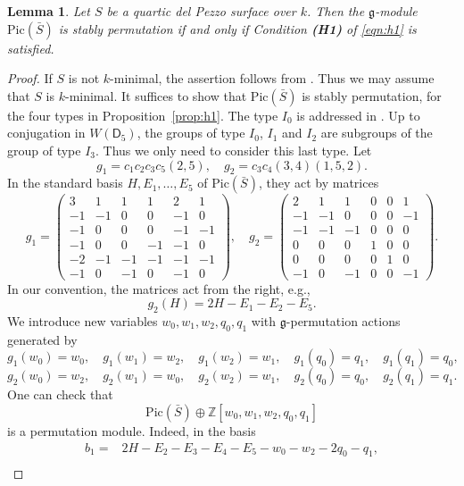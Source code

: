 \documentclass[10pt,a4paper]{amsart}
\newtheorem{lemm}{Lemma}
\def\Pic{\mathrm{Pic}}
\def\bZ{{\mathbb Z}}
\def\sD{{\mathsf D}}
\begin{document}
\begin{lemm}\label{lemm:stablyperm}
    Let $S$ be a quartic del Pezzo surface over $k$. Then 
    the $\mathfrak g$-module 
    $\Pic(\bar{S})$ is stably permutation if and only if Condition {\bf (H1)} of  \eqref{eqn:h1} is satisfied.
\end{lemm}
   \begin{proof}
      If $S$ is not $k$-minimal, the assertion follows from 
      \cite{manin-book}. Thus we may assume that $S$ is $k$-minimal. It suffices to show that $\Pic(\bar{S})$ is stably permutation, for the four types in Proposition~\ref{prop:h1}. The type $I_0$ is addressed in \cite{bctspstably}. Up to conjugation in $W(\sD_5)$, the groups of type $I_0$, $I_1$ and $I_2$ are subgroups of the group of type $I_3$. Thus we only need to consider this last type. 
      Let 
      $$
      g_1=c_1c_2c_3c_5(2,5), \quad g_2=c_3c_4(3,4)(1,5,2).
      $$
      In the standard basis $H, E_1,\ldots,E_5$ of  $\Pic(\bar{S})$, they act by matrices
{\small
$$
g_1=
\begin{pmatrix}
 3& 1& 1& 1& 2& 1\\
-1&-1& 0& 0&-1& 0\\
-1& 0& 0& 0&-1&-1\\
-1& 0& 0&-1&-1& 0\\
-2&-1&-1&-1&-1&-1\\
-1& 0&-1& 0&-1& 0
\end{pmatrix},
\quad
g_2=
\begin{pmatrix}
 2& 1& 1& 0& 0& 1\\
-1&-1& 0& 0& 0&-1\\
-1&-1&-1& 0& 0& 0\\
 0& 0& 0& 1& 0& 0\\
 0& 0& 0& 0& 1& 0\\
-1& 0&-1& 0& 0&-1
\end{pmatrix}.
$$}
In our convention, the matrices act from the right, e.g.,  
$$
g_2(H)=2H-E_1-E_2-E_5.
$$
We introduce new variables $w_0,w_1,w_2,q_0,q_1$ with $\mathfrak g$-permutation actions generated by 
$$
g_1(w_0)=w_0,\quad g_1(w_1)=w_2,\quad g_1(w_2)=w_1,\quad g_1(q_0)=q_1,\quad g_1(q_1)=q_0,
$$
$$
g_2(w_0)=w_2,\quad g_2(w_1)=w_0,\quad g_2(w_2)=w_1,\quad g_2(q_0)=q_0,\quad g_2(q_1)=q_1.
$$
One can check that 
$$
\Pic(\bar{S})\oplus\bZ[w_0,w_1,w_2,q_0,q_1]
$$ 
is a permutation module. Indeed, in the basis
\begin{align*}
b_1={}&
  2H-E_2-E_3-E_4-E_5-w_0-w_2-2q_0-q_1,\\

\end{align*}
\end{proof}
\end{document}
